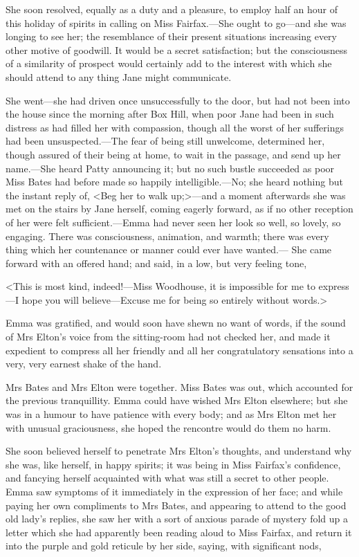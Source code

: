 She soon resolved, equally as a duty and a pleasure, to employ half an hour of this holiday of spirits in calling on Miss Fairfax.—She ought to go—and she was longing to see her; the resemblance of their present situations increasing every other motive of goodwill. It would be a secret satisfaction; but the consciousness of a similarity of prospect would certainly add to the interest with which she should attend to any thing Jane might communicate.

She went—she had driven once unsuccessfully to the door, but had not been into the house since the morning after Box Hill, when poor Jane had been in such distress as had filled her with compassion, though all the worst of her sufferings had been unsuspected.—The fear of being still unwelcome, determined her, though assured of their being at home, to wait in the passage, and send up her name.—She heard Patty announcing it; but no such bustle succeeded as poor Miss Bates had before made so happily intelligible.—No; she heard nothing but the instant reply of, <Beg her to walk up;>—and a moment afterwards she was met on the stairs by Jane herself, coming eagerly forward, as if no other reception of her were felt sufficient.—Emma had never seen her look so well, so lovely, so engaging. There was consciousness, animation, and warmth; there was every thing which her countenance or manner could ever have wanted.— She came forward with an offered hand; and said, in a low, but very feeling tone,

<This is most kind, indeed!—Miss Woodhouse, it is impossible for me to express—I hope you will believe—Excuse me for being so entirely without words.>

Emma was gratified, and would soon have shewn no want of words, if the sound of Mrs Elton's voice from the sitting-room had not checked her, and made it expedient to compress all her friendly and all her congratulatory sensations into a very, very earnest shake of the hand.

Mrs Bates and Mrs Elton were together. Miss Bates was out, which accounted for the previous tranquillity. Emma could have wished Mrs Elton elsewhere; but she was in a humour to have patience with every body; and as Mrs Elton met her with unusual graciousness, she hoped the rencontre would do them no harm.

She soon believed herself to penetrate Mrs Elton's thoughts, and understand why she was, like herself, in happy spirits; it was being in Miss Fairfax's confidence, and fancying herself acquainted with what was still a secret to other people. Emma saw symptoms of it immediately in the expression of her face; and while paying her own compliments to Mrs Bates, and appearing to attend to the good old lady's replies, she saw her with a sort of anxious parade of mystery fold up a letter which she had apparently been reading aloud to Miss Fairfax, and return it into the purple and gold reticule by her side, saying, with significant nods,

